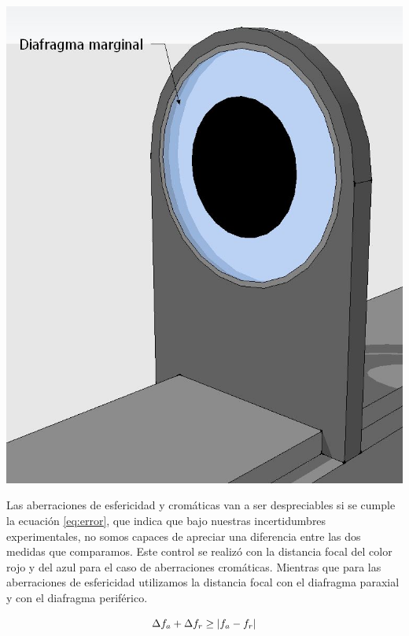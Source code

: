 \documentclass[a4paper,12pt]{article}
\providecommand{\abs}[1]{\lvert#1\rvert}%
\newenvironment{Figure}
  {\par\medskip\noindent\minipage{\linewidth}}
  {\endminipage\par\medskip}
\begin{document}
\begin{multicols*}{2}
        \begin{Figure}
            \centering
            \includegraphics[width=0.7\linewidth]{DiafragmaMarginal.jpg}
            \label{f: Dmarg}
        \end{Figure}

        Las aberraciones de esfericidad y cromáticas van a ser despreciables si se cumple la ecuación \ref{eq:error}, que indica que bajo nuestras incertidumbres experimentales, no somos capaces de apreciar una diferencia entre las dos medidas que comparamos. Este control se realizó con la distancia focal del color rojo y del azul para el caso de aberraciones cromáticas. Mientras que para las aberraciones de esfericidad utilizamos la distancia focal con el diafragma paraxial y con el diafragma periférico.

        \begin{equation}
            \centering
            \Delta f_{a} + \Delta f_{r} \geq \abs{f_{a} - f_{r}}
            \label{eq:error}
        \end{equation}
 
        \begin{Figure}
            \centering


\end{Figure}
\end{multicols*}
\end{document}
